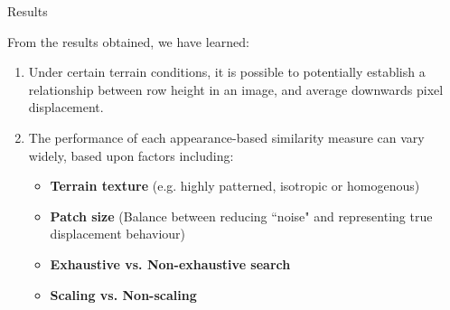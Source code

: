 \documentclass[10pt, compress]{beamer}
\begin{document}
\begin{frame}{Results}

From the results obtained, we have learned:

\begin{enumerate}[label={\arabic*.}]
  \item Under certain terrain conditions, it is possible to potentially establish a relationship between row height in an image, and average downwards pixel displacement. \vspace{0.5cm} 
  \item The performance of each appearance-based similarity measure can vary widely, based upon factors including:
 \vspace{0.2cm} 
  \begin{itemize}[label={\textbullet}]
  	\item \textbf{Terrain texture} (e.g. highly patterned, isotropic or homogenous)
  	\item \textbf{Patch size} (Balance between reducing ``noise" and representing true displacement behaviour)
  	\item \textbf{Exhaustive vs. Non-exhaustive search}
  	\item \textbf{Scaling vs. Non-scaling}
  \end{itemize}
\end{enumerate}

\end{frame}
\end{document}

